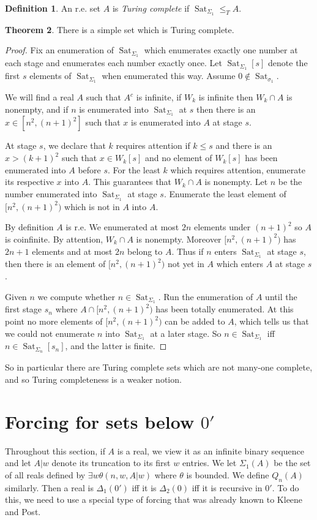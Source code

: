\documentclass[12pt]{report}
\DeclareMathOperator{\Sat}{Sat}
\newcommand{\dfn}[1]{\emph{#1}\index{#1}}
\theoremstyle{definition}
\newtheorem{theorem}{Theorem}[chapter]
\newtheorem{definition}[theorem]{Definition}
\begin{document}
\begin{definition}
An r.e. set $A$ is \dfn{Turing complete} if $\Sat_{\Sigma_1} \leq_T A$.
\end{definition}
\begin{theorem}
There is a simple set which is Turing complete.
\end{theorem}
\begin{proof}
Fix an enumeration of $\Sat_{\Sigma_1}$ which enumerates exactly one number at each stage and enumerates each number exactly once.
Let $\Sat_{\Sigma_1}[s]$ denote the first $s$ elements of $\Sat_{\Sigma_1}$ when enumerated this way.
Assume $0 \notin \Sat_{\sigma_1}$.

We will find a real $A$ such that $A^c$ is infinite, if $W_k$ is infinite then $W_k \cap A$ is nonempty, and if $n$ is enumerated into $\Sat_{\Sigma_1}$ at $s$ then there is an $x \in [n^2, (n+1)^2]$ such that $x$ is enumerated into $A$ at stage $s$.

At stage $s$, we declare that $k$ requires attention if $k \leq s$ and there is an $x > (k+1)^2$ such that $x \in W_k[s]$ and no element of $W_k[s]$ has been enumerated into $A$ before $s$.
For the least $k$ which requires attention, enumerate its respective $x$ into $A$.
This guarantees that $W_k \cap A$ is nonempty.
Let $n$ be the number enumerated into $\Sat_{\Sigma_1}$ at stage $s$. Enumerate the least element of $[n^2, (n+1)^2)$ which is not in $A$ into $A$.

By definition $A$ is r.e. We enumerated at most $2n$ elements under $(n+1)^2$ so $A$ is coinfinite. By attention, $W_k \cap A$ is nonempty.
Moreover $[n^2, (n+1)^2)$ has $2n+1$ elements and at most $2n$ belong to $A$. Thus if $n$ enters $\Sat_{\Sigma_1}$ at stage $s$, then there is an element of $[n^2, (n+1)^2)$ not yet in $A$ which enters $A$ at stage $s$.

Given $n$ we compute whether $n \in \Sat_{\Sigma_1}$. Run the enumeration of $A$ until the first stage $s_n$ where $A \cap [n^2, (n+1)^2)$ has been totally enumerated. At this point no more elements of $[n^2, (n+1)^2)$ can be added to $A$, which tells us that we could not enumerate $n$ into $\Sat_{\Sigma_1}$ at a later stage.
So $n \in \Sat_{\Sigma_1}$ iff $n \in \Sat_{\Sigma_n}[s_n]$, and the latter is finite.
\end{proof}
So in particular there are Turing complete sets which are not many-one complete, and so Turing completeness is a weaker notion.

\section{Forcing for sets below $0'$}
Throughout this section, if $A$ is a real, we view it as an infinite binary sequence and let $A|w$ denote its truncation to its first $w$ entries.
We let $\Sigma_1(A)$ be the set of all reals defined by $\exists w\theta(n, w, A|w)$ where $\theta$ is bounded. We define $Q_n(A)$ similarly.
Then a real is $\Delta_1(0')$ iff it is $\Delta_2(0)$ iff it is recursive in $0'$.
To do this, we need to use a special type of forcing that was already known to Kleene and Post.
\end{document}
